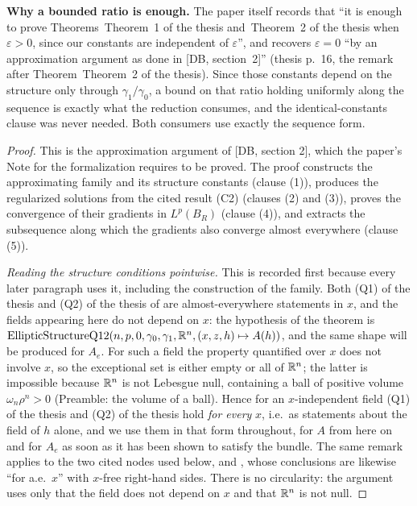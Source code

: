 \begin{helper}
\textbf{Why a bounded ratio is enough.}  The paper itself records that ``it is
enough to prove Theorems~Theorem~1 of the thesis and~Theorem~2 of the thesis when $\varepsilon>0$,
since our constants are independent of $\varepsilon$'', and recovers
$\varepsilon=0$ ``by an approximation argument as done in [DB, section~2]''
(thesis p.~16, the remark after Theorem~Theorem~2 of the thesis).  Since those constants
depend on the structure only through $\gamma_1/\gamma_0$, a bound on that ratio
holding uniformly along the sequence is exactly what the reduction consumes, and
the identical-constants clause was never needed.  Both consumers
use exactly the sequence form.
\end{helper}
\begin{proof}
This is the approximation argument of [DB, section 2], which the paper's Note
for the formalization requires to be proved.  The proof constructs the
approximating family and its structure constants (clause (1)), produces the
regularized solutions from the cited result (C2) (clauses (2) and (3)), proves
the convergence of their gradients in $L^p(B_R)$ (clause (4)), and extracts the
subsequence along which the gradients also converge almost everywhere (clause
(5)).

\emph{Reading the structure conditions pointwise.}  This is recorded first
because every later paragraph uses it, including the construction of the family.
Both (Q1) of the thesis and (Q2) of the thesis of  are
almost-everywhere statements in $x$, and the fields appearing here do not depend
on $x$: the hypothesis of the theorem is
$\mathrm{EllipticStructureQ12}(n,p,0,\gamma_0,\gamma_1,\mathbb{R}^n,(x,z,h)\mapsto A(h))$,
and the same shape will be produced for $A_e$.  For such a field the property
quantified over $x$ does not involve $x$, so the exceptional set is either empty
or all of $\mathbb{R}^n$; the latter is impossible because $\mathbb{R}^n$ is not Lebesgue null,
containing a ball of positive volume $\omega_n\rho^n>0$ (Preamble: the volume of
a ball).  Hence for an $x$-independent field (Q1) of the thesis and (Q2) of the thesis
hold \emph{for every} $x$, i.e.\ as statements about the field of $h$ alone, and
we use them in that form throughout, for $A$ from here on and for $A_e$ as soon
as it has been shown to satisfy the bundle.  The same remark applies to the two
cited nodes used below,  and
, whose conclusions are likewise ``for a.e.\ $x$''
with $x$-free right-hand sides.  There is no circularity: the argument uses only
that the field does not depend on $x$ and that $\mathbb{R}^n$ is not null.


\end{proof}
